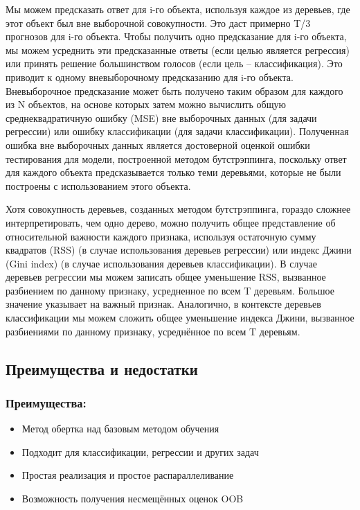 Мы можем предсказать ответ для i-го объекта, используя каждое из деревьев, где этот объект был вне выборочной совокупности. Это даст примерно T/3 прогнозов для i-го объекта. Чтобы получить одно предсказание для i-го объекта, мы можем усреднить эти предсказанные ответы (если целью является регрессия) или принять решение большинством голосов (если цель – классификация). Это приводит к одному вневыборочному предсказанию для i-го объекта. Вневыборочное предсказание может быть получено таким образом для каждого из N объектов, на основе которых затем можно вычислить общую среднеквадратичную ошибку (MSE) вне выборочных данных (для задачи регрессии) или ошибку классификации (для задачи классификации). Полученная ошибка вне выборочных данных является достоверной оценкой ошибки тестирования для модели, построенной методом бутстрэппинга, поскольку ответ для каждого объекта предсказывается только теми деревьями, которые не были построены с использованием этого объекта.

Хотя совокупность деревьев, созданных методом бутстрэппинга, гораздо сложнее интерпретировать, чем одно дерево, можно получить общее представление об относительной важности каждого признака, используя остаточную сумму квадратов (RSS) (в случае использования деревьев регрессии) или индекс Джини (Gini index) (в случае использования деревьев классификации). В случае деревьев регрессии мы можем записать общее уменьшение RSS, вызванное разбиением по данному признаку, усредненное по всем T деревьям. Большое значение указывает на важный признак. Аналогично, в контексте деревьев классификации мы можем сложить общее уменьшение индекса Джини, вызванное разбиениями по данному признаку, усреднённое по всем T деревьям.


\subsection*{Преимущества и недостатки}
\subsubsection*{Преимущества:}
\begin{itemize}
    \item Метод обертка над базовым методом обучения
    \item Подходит для классификации, регрессии и других задач
    \item Простая реализация и простое распараллеливание
    \item Возможность получения несмещённых оценок OOB
\end{itemize}
